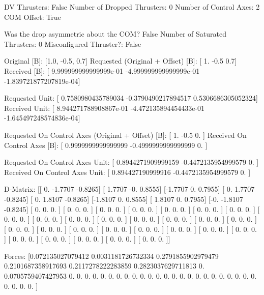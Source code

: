 DV Thrusters:	False
Number of Dropped Thrusters:	0
Number of Control Axes:	2
COM Offset:	True

Was the drop asymmetric about the COM?	False
Number of Saturated Thrusters:	0
Misconfigured Thruster?:	False

Original [B]:	[1.0, -0.5, 0.7]
Requested (Original + Offset) [B]:	[ 1.  -0.5  0.7]
Received [B]:		[ 9.999999999999999e-01 -4.999999999999999e-01 -1.839721877207819e-04]

Requested Unit:		[ 0.7580980435789034 -0.3790490217894517  0.5306686305052324]
Received Unit:		[ 8.944271788908867e-01 -4.472135894454433e-01 -1.645497248574836e-04]

Requested On Control Axes (Original + Offset) [B]:	[ 1.  -0.5  0. ]
Received On Control Axes [B]:		[ 0.9999999999999999 -0.4999999999999999  0.                ]

Requested On Control Axes Unit:		[ 0.8944271909999159 -0.4472135954999579  0.                ]
Received On Control Axes Unit:		[ 0.894427190999916  -0.4472135954999579  0.                ]

D-Matrix:
[[ 0.     -1.7707 -0.8265]
 [ 1.7707 -0.      0.8555]
 [-1.7707  0.      0.7955]
 [ 0.      1.7707 -0.8245]
 [ 0.      1.8107 -0.8265]
 [-1.8107  0.      0.8555]
 [ 1.8107  0.      0.7955]
 [-0.     -1.8107 -0.8245]
 [ 0.      0.      0.    ]
 [ 0.      0.      0.    ]
 [ 0.      0.      0.    ]
 [ 0.      0.      0.    ]
 [ 0.      0.      0.    ]
 [ 0.      0.      0.    ]
 [ 0.      0.      0.    ]
 [ 0.      0.      0.    ]
 [ 0.      0.      0.    ]
 [ 0.      0.      0.    ]
 [ 0.      0.      0.    ]
 [ 0.      0.      0.    ]
 [ 0.      0.      0.    ]
 [ 0.      0.      0.    ]
 [ 0.      0.      0.    ]
 [ 0.      0.      0.    ]
 [ 0.      0.      0.    ]
 [ 0.      0.      0.    ]
 [ 0.      0.      0.    ]
 [ 0.      0.      0.    ]
 [ 0.      0.      0.    ]
 [ 0.      0.      0.    ]
 [ 0.      0.      0.    ]
 [ 0.      0.      0.    ]
 [ 0.      0.      0.    ]
 [ 0.      0.      0.    ]
 [ 0.      0.      0.    ]
 [ 0.      0.      0.    ]]

Forces:
[0.072135027079412  0.0031181726732334 0.2791855902979479
 0.2101687358917693 0.2117278222283859 0.2823037629711813
 0.                 0.0705759407427953 0.
 0.                 0.                 0.
 0.                 0.                 0.
 0.                 0.                 0.
 0.                 0.                 0.
 0.                 0.                 0.
 0.                 0.                 0.
 0.                 0.                 0.
 0.                 0.                 0.
 0.                 0.                 0.                ]

